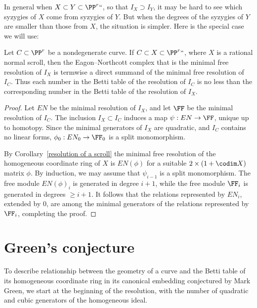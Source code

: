 In general when $X\subset Y\subset \PP^r` `$, so that $I_X \supset I_Y$,
it may be hard to see which syzygies of $X$ come
from syzygies of $Y$. But when the degrees of the syzygies of $Y$ are
smaller than those from $X$, the situation is simpler.
Here is the special case we will use:

\begin{proposition}\label{containment of resolutions}
Let $C\subset \PP^r$ be
a nondegenerate curve. If $C\subset X
\subset \PP^r` `$, where $X$ is a rational
%
normal scroll, then the Eagon--Northcott complex that is  the minimal
free resolution of $I_X$ is termwise a direct summand
of the minimal free resolution of $I_C$. Thus each number in the Betti table of the
%
resolution of $I_C$ is  
no less than
the corresponding number in the Betti table of the resolution of $I_X$.
\unif
\end{proposition}

\begin{proof}
Let $EN$ be the minimal resolution of $I_X$, and let $\FF$ be the minimal
resolution of $I_C$.
The inclusion $I_X \subset I_C$ induces a map $\psi: EN\to \FF$, unique
up to homotopy. Since the minimal generators of $I_X$ are quadratic,
and $I_C$ contains no linear forms, $\phi_0: EN_0\to \FF_0$ is a split
monomorphism.

By Corollary~\ref{resolution of a scroll} the minimal free resolution of the homogeneous
coordinate ring of $X$ is $EN(\phi)$ for a suitable $2\times (1+\codim X)$ matrix $\phi$.
By induction, we may assume that $\psi_{i-1}$ is a split monomorphism. The
free module $EN(\phi)_{i}$ is generated in
degree $i+1$, while the free module $\FF_i$ is generated in degrees
$\geq i+1$. It follows that the relations
represented by $EN_i$, extended by 0, are among the minimal generators
of the relations represented by $\FF_i$,
completing the proof.
\end{proof}

\section{Green's conjecture}
\label{Greenconj}

To describe relationship between the geometry of
a curve and the Betti table of its homogeneous coordinate ring
in its canonical embedding
conjectured by Mark Green,
%
 we start at the beginning of the resolution, with 
the number of quadratic and cubic generators of the homogeneous ideal.

